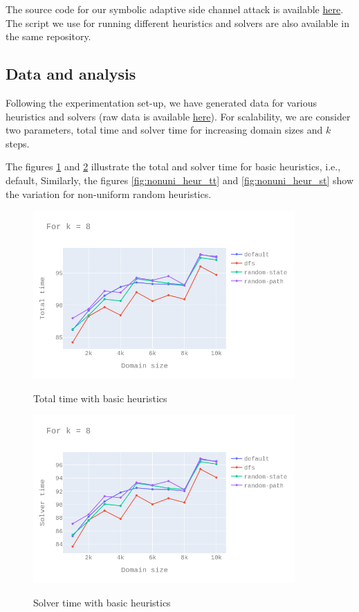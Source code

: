 \documentclass[11pt,a4paper,notitlepage]{article}
\begin{document}
The source code for our symbolic adaptive side channel attack is available \href{https://github.com/irfansha/LBS_projects/tree/master/final_project}{here}.
The script we use for running different heuristics and solvers are also available in the same repository.

\subsection{Data and analysis}
\label{subsec:dataandanalysis}

Following the experimentation set-up, we have generated data for various heuristics and solvers (raw data is available \href{https://github.com/irfansha/LBS_projects/tree/master/final_project/data}{here}).
For scalability, we are consider two parameters, total time and solver time for increasing domain sizes and $k$ steps.

The figures \ref{fig:basic_heur_tt} and \ref{fig:basic_heur_st} illustrate the total and solver time for basic heuristics, i.e., default, 
Similarly, the figures \ref{fig:nonuni_heur_tt} and \ref{fig:nonuni_heur_st} show the variation for non-uniform random heuristics.

\begin{figure}[h]
\centering
\includegraphics[width=10cm]{k_8_tt_basic_heur.png}
\label{fig:basic_heur_tt}
\caption{Total time with basic heuristics}
\centering
\end{figure}

\begin{figure}[h]
\centering
\includegraphics[width=10cm]{k_8_st_basic_heur.png}
\label{fig:basic_heur_st}
\caption{Solver time with basic heuristics}
\centering
\end{figure}
\end{document}
